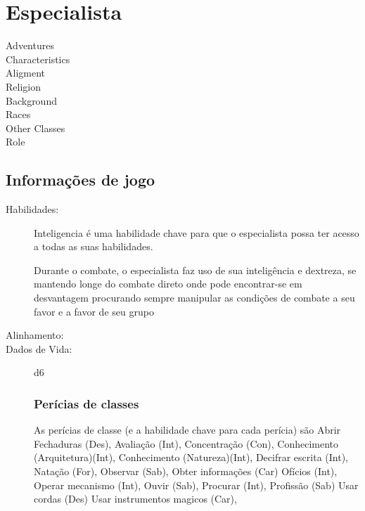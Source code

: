 \section{Especialista}
\begin{description}
\item[Adventures]
\item[Characteristics]
\item[Aligment]
\item[Religion]
\item[Background]
\item[Races]
\item[Other Classes]
\item[Role]
\end{description}

\subsection{Informa\c{c}\~oes de jogo}
\begin{description}
\item[Habilidades:]
Inteligencia \'e uma habilidade chave para que o
especialista possa ter acesso a todas as suas habilidades.

Durante o combate, o especialista faz uso de sua intelig\^encia
e dextreza, se mantendo longe do combate direto onde pode
encontrar-se em desvantagem procurando sempre manipular as
condi\c{c}\~oes de combate a seu favor e a favor de seu grupo
\item[Alinhamento:]
\item[Dados de Vida:] d6
\subsubsection{Per\'icias de classes}
As per\'icias de classe (e a habilidade chave para cada per\'icia) s\~ao
Abrir Fechaduras (Des),
Avalia\c{c}\~ao (Int),
  Concentra\c{c}\~ao (Con),
  Conhecimento (Arquitetura)(Int),
  Conhecimento (Natureza)(Int),
  Decifrar escrita (Int),
  Nata\c{c}\~ao (For),
  Observar (Sab),
  Obter informa\c{c}\~oes (Car)
  Of\'icios (Int),
  Operar mecanismo (Int),
  Ouvir (Sab),
  Procurar (Int),
  Profiss\~ao (Sab)
  Usar cordas (Des)
  Usar instrumentos magicos (Car),
\end{description}

